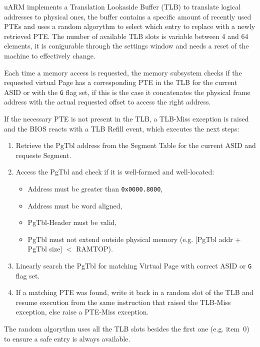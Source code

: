 

\vspace{10px}

uARM implements a Translation Lookaside Buffer (TLB) to translate logical addresses to physical ones, the buffer contains a specific amount of recently used PTEs and uses a random algorythm to select which entry to replace with a newly retrieved PTE.
The number of available TLB slots is variable between 4 and 64 elements, it is conigurable through the settings window and needs a reset of the machine to effectively change.

Each time a memory access is requested, the memory subsystem checks if the requested virtual Page has a corresponding PTE in the TLB for the current ASID or with the \texttt{G} flag set, if this is the case it concatenates the physical frame address with the actual requested offset to access the right address.

If the necessary PTE is not present in the TLB, a TLB-Miss exception is raised and the BIOS reacts with a TLB Refill event, which executes the next steps:
\begin{enumerate}
\item Retrieve the PgTbl address from the Segment Table for the current ASID and requeste Segment.
\item Access the PgTbl and check if it is well-formed and well-located:
	\begin{itemize}
	\item Address must be greater than \texttt{0x0000.8000},
	\item Address must be word aligned,
	\item PgTbl-Header must be valid,
	\item PgTbl must not extend outside physical memory (e.g. [PgTbl addr + PgTbl size] $<$ RAMTOP).
	\end{itemize}
\item Linearly search the PgTbl for matching Virtual Page with correct ASID or \texttt{G} flag set.
\item If a matching PTE was found, write it back in a random slot of the TLB and resume execution from the same instruction that raised the TLB-Miss exception, else raise a PTE-Miss exception.
\end{enumerate}

The random algorythm uses all the TLB slots besides the first one (e.g. item~0) to ensure a safe entry is always available.